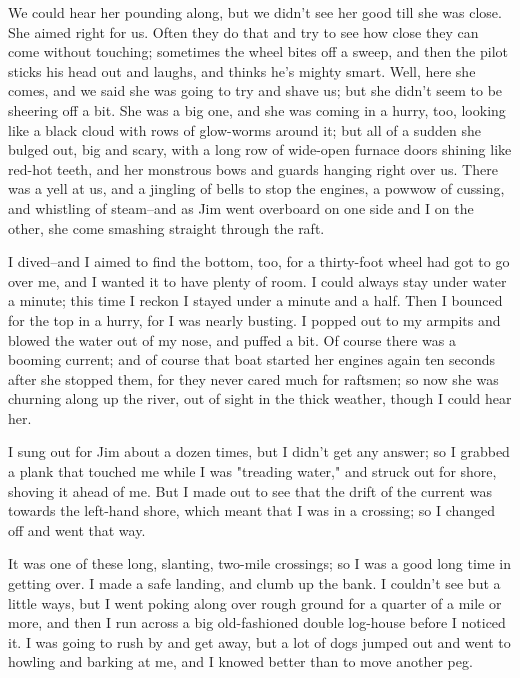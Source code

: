 We could hear her pounding along, but we didn't see her good till she was
close.  She aimed right for us.  Often they do that and try to see how
close they can come without touching; sometimes the wheel bites off a
sweep, and then the pilot sticks his head out and laughs, and thinks he's
mighty smart.  Well, here she comes, and we said she was going to try and
shave us; but she didn't seem to be sheering off a bit.  She was a big
one, and she was coming in a hurry, too, looking like a black cloud with
rows of glow-worms around it; but all of a sudden she bulged out, big and
scary, with a long row of wide-open furnace doors shining like red-hot
teeth, and her monstrous bows and guards hanging right over us.  There
was a yell at us, and a jingling of bells to stop the engines, a powwow
of cussing, and whistling of steam--and as Jim went overboard on one side
and I on the other, she come smashing straight through the raft.

I dived--and I aimed to find the bottom, too, for a thirty-foot wheel had
got to go over me, and I wanted it to have plenty of room.  I could
always stay under water a minute; this time I reckon I stayed under a
minute and a half.  Then I bounced for the top in a hurry, for I was
nearly busting.  I popped out to my armpits and blowed the water out of
my nose, and puffed a bit.  Of course there was a booming current; and of
course that boat started her engines again ten seconds after she stopped
them, for they never cared much for raftsmen; so now she was churning
along up the river, out of sight in the thick weather, though I could
hear her.

I sung out for Jim about a dozen times, but I didn't get any answer; so I
grabbed a plank that touched me while I was "treading water," and struck
out for shore, shoving it ahead of me.  But I made out to see that the
drift of the current was towards the left-hand shore, which meant that I
was in a crossing; so I changed off and went that way.

It was one of these long, slanting, two-mile crossings; so I was a good
long time in getting over.  I made a safe landing, and clumb up the bank.
I couldn't see but a little ways, but I went poking along over rough
ground for a quarter of a mile or more, and then I run across a big
old-fashioned double log-house before I noticed it.  I was going to rush
by and get away, but a lot of dogs jumped out and went to howling and
barking at me, and I knowed better than to move another peg.




